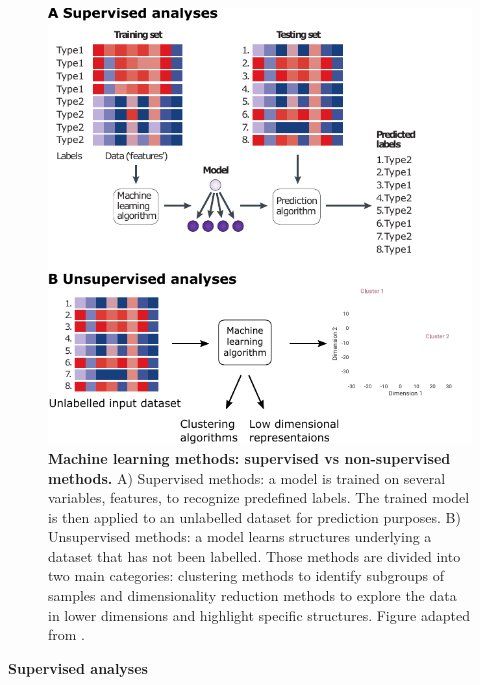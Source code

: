 \begin{figure}[H]
    \centering
    \includegraphics[width=1\textwidth]{Figures/Intro/supervised_vs_unsupervised.pdf}
    \caption[Machine learning methods: supervised vs non-supervised methods.]{\textbf{Machine learning methods: supervised vs non-supervised methods.} A) Supervised methods: a model is trained on several variables, features, to recognize predefined labels. The trained model is then applied to an unlabelled dataset for prediction purposes. B) Unsupervised methods: a model learns structures underlying a dataset that has not been labelled. Those methods are divided into two main categories: clustering methods to identify subgroups of samples and dimensionality reduction methods to explore the data in lower dimensions and highlight specific structures. Figure adapted from \cite{Libbrecht2015}. }
    \label{fig:intro_supervisedVSunsupervised}
\end{figure}

\textbf{Supervised analyses}
\newline 

